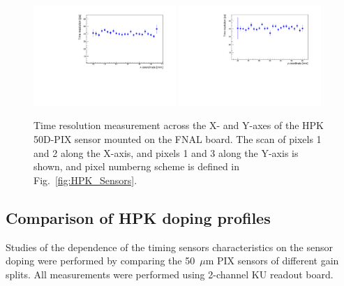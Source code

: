 \documentclass[preprint,1p]{elsarticle}
\begin{document}
\begin{figure}[htbp] 
\centering
\includegraphics[width=0.48\textwidth]{figs/FNALBoard_HPK50DPix_Run847-891/TimeResolution_vs_X_Ch4_5.pdf} 
\includegraphics[width=0.48\textwidth]{figs/FNALBoard_HPK50DPix_Run847-891/TimeResolution_vs_Y_Ch3_4.pdf} 
\caption{Time resolution measurement across the X- and Y-axes of the HPK 50D-PIX sensor mounted on the FNAL board. The scan of pixels 1 and 2 along the X-axis, and pixels 1 and 3 along the Y-axis is shown, and pixel numberng scheme is defined in Fig.~\ref{fig:HPK_Sensors}.} 
\label{fig:FNAL_HPK50_SigmaTXY} 
\end{figure} 




\subsection{Comparison of HPK doping profiles}

Studies of the dependence of the timing sensors characteristics on the sensor
doping were performed by comparing the 50~$\mu$m PIX sensors of different gain
splits. All measurements were performed using 2-channel KU readout board. 
\end{document}
